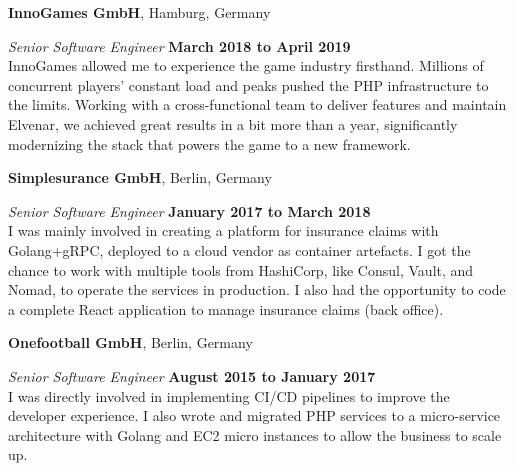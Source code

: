 \documentclass[12pt]{article}
\newcommand{\halfblankline}{\quad\vspace{-0.5\baselineskip}\pagebreak[3]}
\begin{document}
\textbf{InnoGames GmbH},
Hamburg, Germany
\begin{outerlist}

    \item[] \textit{Senior Software Engineer}%
            \hfill \textbf{March 2018 to April 2019}\\
            InnoGames allowed me to experience the game industry firsthand. Millions of concurrent players' constant load and peaks pushed the PHP infrastructure to the limits. Working with a cross-functional team to deliver features and maintain Elvenar, we achieved great results in a bit more than a year, significantly modernizing the stack that powers the game to a new framework.
            
\end{outerlist}

\halfblankline

\textbf{Simplesurance GmbH},
Berlin, Germany
\begin{outerlist}

    \item[] \textit{Senior Software Engineer}%
            \hfill \textbf{January 2017 to March 2018}\\
            I was mainly involved in creating a platform for insurance claims with Golang+gRPC, deployed to a cloud vendor as container artefacts. I got the chance to work with multiple tools from HashiCorp, like Consul, Vault, and Nomad, to operate the services in production. I also had the opportunity to code a complete React application to manage insurance claims (back office).
            
\end{outerlist}

\halfblankline

\textbf{Onefootball GmbH},
Berlin, Germany
\begin{outerlist}

    \item[] \textit{Senior Software Engineer}%
            \hfill \textbf{August 2015 to January 2017}\\
            I was directly involved in implementing CI/CD pipelines to improve the developer experience. I also wrote and migrated PHP services to a micro-service architecture with Golang and EC2 micro instances to allow the business to scale up.
            
\end{outerlist}

\halfblankline
\end{document}
